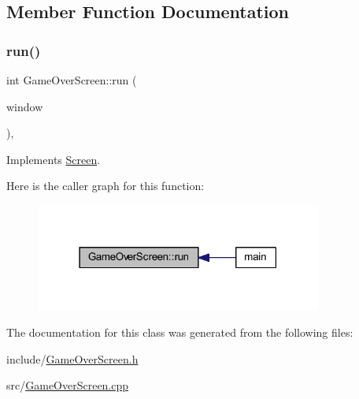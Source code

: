 \subsection{Member Function Documentation}
\mbox{\label{class_game_over_screen_aff38f34b95835895e285c735c5c9f3c7}} 
\subsubsection{\texorpdfstring{run()}{run()}}
{\footnotesize\ttfamily int Game\+Over\+Screen\+::run (\begin{DoxyParamCaption}\item[{sf\+::\+Render\+Window \&}]{window }\end{DoxyParamCaption})\hspace{0.3cm}{\ttfamily [override]}, {\ttfamily [virtual]}}



Implements \hyperlink{class_screen_aac0f7f072481e517dafc85ad292d6f00}{Screen}.

Here is the caller graph for this function\+:
\nopagebreak
\begin{figure}[H]
\begin{center}
\leavevmode
\includegraphics[width=267pt]{class_game_over_screen_aff38f34b95835895e285c735c5c9f3c7_icgraph}
\end{center}
\end{figure}


The documentation for this class was generated from the following files\+:\begin{DoxyCompactItemize}
\item 
include/\hyperlink{_game_over_screen_8h}{Game\+Over\+Screen.\+h}\item 
src/\hyperlink{_game_over_screen_8cpp}{Game\+Over\+Screen.\+cpp}\end{DoxyCompactItemize}
